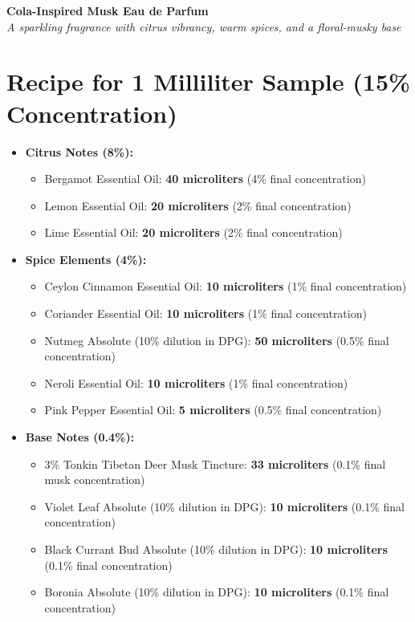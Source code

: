 \documentclass{article}
\begin{document}
\begin{center}
\textcolor{colaDark}{\LARGE\textbf{Cola-Inspired Musk Eau de Parfum}}\\[0.5cm]
\textcolor{colaBrown}{\large\textit{A sparkling fragrance with citrus vibrancy, warm spices, and a floral-musky base}}\\[1cm]
\end{center}

\section*{Recipe for 1 Milliliter Sample (15\% Concentration)}

\begin{itemize}[leftmargin=*]
  \item \textcolor{colaRed}{\textbf{Citrus Notes (8\%):}}
  \begin{itemize}
    \item Bergamot Essential Oil: \textbf{40 microliters} (4\% final concentration)
    \item Lemon Essential Oil: \textbf{20 microliters} (2\% final concentration)
    \item Lime Essential Oil: \textbf{20 microliters} (2\% final concentration)
  \end{itemize}
  
  \item \textcolor{colaRed}{\textbf{Spice Elements (4\%):}}
  \begin{itemize}
    \item Ceylon Cinnamon Essential Oil: \textbf{10 microliters} (1\% final concentration)
    \item Coriander Essential Oil: \textbf{10 microliters} (1\% final concentration)
    \item Nutmeg Absolute (10\% dilution in DPG): \textbf{50 microliters} (0.5\% final concentration)
    \item Neroli Essential Oil: \textbf{10 microliters} (1\% final concentration)
    \item Pink Pepper Essential Oil: \textbf{5 microliters} (0.5\% final concentration)
  \end{itemize}
  
  \item \textcolor{colaRed}{\textbf{Base Notes (0.4\%):}}
  \begin{itemize}
    \item 3\% Tonkin Tibetan Deer Musk Tincture: \textbf{33 microliters} (0.1\% final musk concentration)
    \item Violet Leaf Absolute (10\% dilution in DPG): \textbf{10 microliters} (0.1\% final concentration)
    \item Black Currant Bud Absolute (10\% dilution in DPG): \textbf{10 microliters} (0.1\% final concentration)
    \item Boronia Absolute (10\% dilution in DPG): \textbf{10 microliters} (0.1\% final concentration)
  \end{itemize}
  

\end{itemize}
\end{document}
